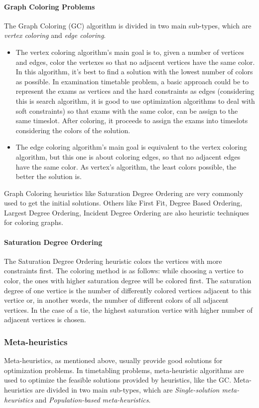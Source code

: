 \paragraph{Graph Coloring Problems}
The Graph Coloring (GC) algorithm is divided in two main sub-types, which are \textit{vertex coloring} and \textit{edge coloring}.
\begin{itemize}
  \item The vertex coloring algorithm's main goal is to, given a number of vertices and edges, color the vertexes so that no adjacent vertices have the same color. In this algorithm, it's best to find a solution with the lowest number of colors as possible. In examination timetable problem, a basic approach could be to represent the exams as vertices and the hard constraints as edges (considering this is search algorithm, it is good to use optimization algorithms to deal with soft constraints) so that exams with the same color, can be assign to the same timeslot. After coloring, it proceeds to assign the exams into timeslots considering the colors of the solution. ~\cite{Qu2009}
  \item The edge coloring algorithm's main goal is equivalent to the vertex coloring algorithm, but this one is about coloring edges, so that no adjacent edges have the same color. As vertex's algorithm, the least colors possible, the better the solution is.
\end{itemize}

Graph Coloring heuristics like Saturation Degree Ordering are very commonly used to get the initial solutions. Others like First Fit, Degree Based Ordering, Largest Degree Ordering, Incident Degree Ordering are also heuristic techniques for coloring graphs.\\

\paragraph{Saturation Degree Ordering}
The Saturation Degree Ordering heuristic colors the vertices with more constraints first. The coloring method is as follows: while choosing a vertice to color, the ones with higher saturation degree will be colored first. The saturation degree of one vertice is the number of differently colored vertices adjacent to this vertice or, in another words, the number of different colors of all adjacent vertices. In the case of a tie, the highest saturation vertice with higher number of adjacent vertices is chosen.

\subsubsection{Meta-heuristics}
Meta-heuristics, as mentioned above, usually provide good solutions for optimization problems. In timetabling problems, meta-heuristic algorithms are used to optimize the feasible solutions provided by heuristics, like the GC. Meta-heuristics are divided in two main sub-types, which are \textit{Single-solution meta-heuristics} and \textit{Population-based meta-heuristics}.~\cite{Talbi2009}\\

